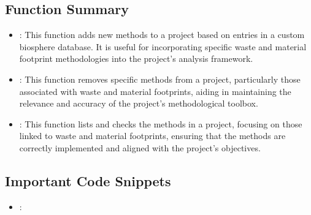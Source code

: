 \documentclass[letterpaper,10pt,english]{sphinxmanual}
\begin{document}
\subsection{Function Summary}
\label{\detokenize{MethodEditor:function-summary}}\begin{itemize}
\item {} 
\sphinxAtStartPar
{}: This function adds new methods to a project based on entries in a custom biosphere database.
It is useful for incorporating specific waste and material footprint methodologies into the project’s analysis framework.

\item {} 
\sphinxAtStartPar
{}: This function removes specific methods from a project, particularly those associated with
waste and material footprints, aiding in maintaining the relevance and accuracy of the project’s methodological toolbox.

\item {} 
\sphinxAtStartPar
{}: This function lists and checks the methods in a project, focusing on those linked to waste
and material footprints, ensuring that the methods are correctly implemented and aligned with the project’s objectives.

\end{itemize}


\subsection{Important Code Snippets}
\label{\detokenize{MethodEditor:important-code-snippets}}\begin{itemize}
\item {} 
\sphinxAtStartPar
{}:

\end{itemize}
\end{document}
